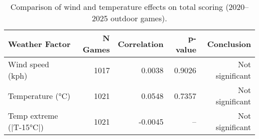 \begin{table}[t]
  \centering
  \small
  \caption[Weather effects on scoring]{Comparison of wind and temperature effects on total scoring (2020--2025 outdoor games).}
  \label{tab:weather-effects}
  \setlength{\tabcolsep}{4pt}\renewcommand{\arraystretch}{1.12}
  \begin{tabular}{@{} l r r r r @{} }
    \toprule
    \textbf{Weather Factor}  & \textbf{N Games}  & \textbf{Correlation}  & \textbf{p-value}  & \textbf{Conclusion} \\
    \midrule
    Wind speed (kph) & 1017 & 0.0038 & 0.9026 & Not significant \\
    Temperature (°C) & 1021 & 0.0548 & 0.7357 & Not significant \\
    Temp extreme (|T-15°C|) & 1021 & -0.0045 & -- & Not significant \\
    \bottomrule
  \end{tabular}
\end{table}
